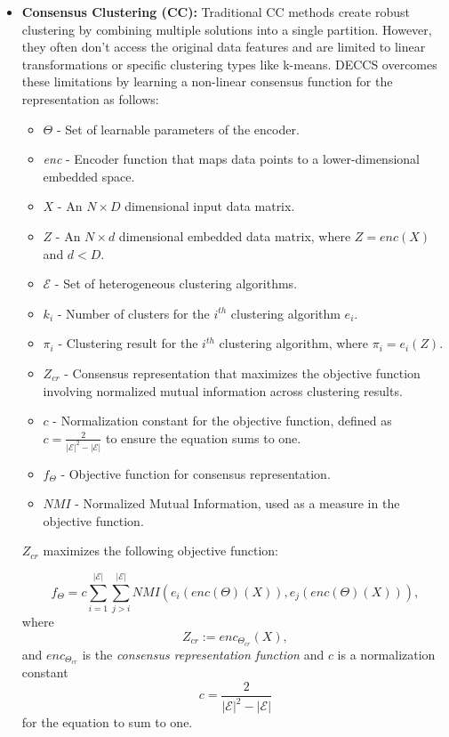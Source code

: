 \begin{itemize}
\item \textbf{Consensus Clustering (CC):} Traditional CC methods create robust clustering by combining multiple solutions into a single partition. However, they often don't access the original data features and are limited to linear transformations or specific clustering types like k-means. DECCS overcomes these limitations by learning a non-linear consensus function for the representation as follows:

\begin{itemize}
    \item \(\Theta\) - Set of learnable parameters of the encoder.
    \item \textit{enc} - Encoder function that maps data points to a lower-dimensional embedded space.
    \item \(X\) - An \(N \times D\) dimensional input data matrix.
    \item \(Z\) - An \(N \times d\) dimensional embedded data matrix, where \(Z = \textit{enc}(X)\) and \(d < D\).
    \item \(\mathcal{E}\) - Set of heterogeneous clustering algorithms.
    \item \(k_i\) - Number of clusters for the \(i^{th}\) clustering algorithm \(e_i\).
    \item \(\pi_i\) - Clustering result for the \(i^{th}\) clustering algorithm, where \(\pi_i = e_i(Z)\).
    \item \(Z_{cr}\) - Consensus representation that maximizes the objective function involving normalized mutual information across clustering results.
    \item \(c\) - Normalization constant for the objective function, defined as \(c = \frac{2}{|\mathcal{E}|^2-|\mathcal{E}|}\) to ensure the equation sums to one.
    \item \(f_{\Theta}\) - Objective function for consensus representation.
    \item \(NMI\) - Normalized Mutual Information, used as a measure in the objective function.
\end{itemize}

\(Z_{cr}\) maximizes the following objective function:

\[
f_{\Theta} = c \sum_{i=1}^{|\mathcal{E}|} \sum_{j>i}^{|\mathcal{E}|} NMI(e_i(\textit{enc}(\Theta)(X)), e_j(\textit{enc}(\Theta)(X))),
\]
where
\[
Z_{cr} := \textit{enc}_{\Theta_{cr}}(X),
\]
and \(\textit{enc}_{\Theta_{cr}}\) is the \textit{consensus representation function} and \(c\) is a normalization constant
\[
c = \frac{2}{|\mathcal{E}|^2-|\mathcal{E}|}
\]
for the equation to sum to one.


\end{itemize}
